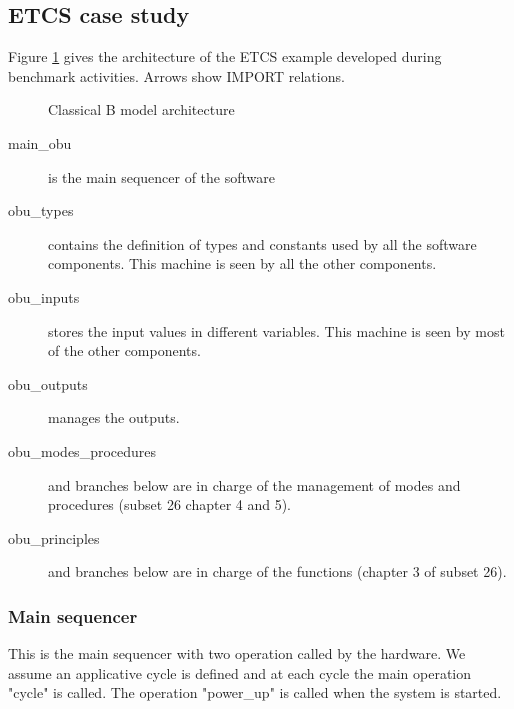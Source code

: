 \subsection{ETCS  case study}


Figure \ref{fig:graphe} gives the architecture of the ETCS example developed during benchmark activities. Arrows show IMPORT relations.

 \begin{figure}
  \centering
  \caption{Classical B  model architecture}
  \label{fig:graphe}
\end{figure}


\begin{description}
\item[main\_obu] is the main sequencer of the software
\item[obu\_types] contains the definition of types and constants used by all the software components. This machine is seen by all the other components.
\item[obu\_inputs] stores the input values in different variables. This machine is seen by most of the other components.
\item[obu\_outputs] manages the outputs.
\item[obu\_modes\_procedures] and branches below are in charge of the management of modes and procedures (subset 26 chapter 4 and 5).
\item[obu\_principles] and branches below are in charge of the functions (chapter 3 of subset 26).
\end{description}

\subsubsection{Main sequencer}

This is the main sequencer with two operation called by the hardware. We assume an applicative cycle is defined and at each cycle the main operation "cycle" is called. The operation "power\_up" is called when the system is started.


